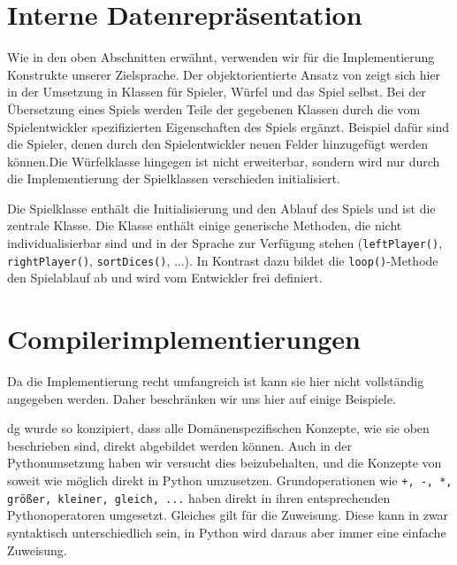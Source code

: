\section{Interne Datenrepräsentation} %
\label{sec:interne_datenreprasentation}
    Wie in den oben Abschnitten erwähnt, verwenden wir für die Implementierung Konstrukte unserer Zielsprache. Der objektorientierte Ansatz von \dg zeigt sich hier in der Umsetzung in Klassen für Spieler, Würfel und das Spiel selbst. Bei der Übersetzung eines Spiels werden Teile der gegebenen Klassen durch die vom Spielentwickler spezifizierten Eigenschaften des Spiels ergänzt. Beispiel dafür sind die Spieler, denen durch den Spielentwickler neuen Felder hinzugefügt werden können.Die Würfelklasse hingegen ist nicht erweiterbar, sondern wird nur durch die Implementierung der Spielklassen verschieden initialisiert.
    
    Die Spielklasse enthält die Initialisierung und den Ablauf des Spiels und ist die zentrale Klasse. Die Klasse enthält einige generische Methoden, die nicht individualisierbar sind und in der Sprache zur Verfügung stehen (\texttt{leftPlayer()}, \texttt{rightPlayer()}, \texttt{sortDices()}, ...). In Kontrast dazu bildet die \texttt{loop()}-Methode den Spielablauf ab und wird vom Entwickler frei definiert.
    

\section{Compilerimplementierungen}
\label{sec:compilerimplementierungen}
	Da die Implementierung recht umfangreich ist kann sie hier nicht vollständig angegeben werden. Daher beschränken wir uns hier auf einige Beispiele.
	
dg wurde so konzipiert, dass alle Domänenspezifischen Konzepte, wie sie oben beschrieben sind, direkt abgebildet werden können. Auch in der Pythonumsetzung haben wir versucht dies beizubehalten, und die Konzepte von \dg soweit wie möglich direkt in Python umzusetzen. Grundoperationen wie \texttt{+, -, *, größer, kleiner, gleich, ...} haben direkt in ihren entsprechenden Pythonoperatoren umgesetzt. Gleiches gilt für die Zuweisung. Diese kann in \dg zwar syntaktisch unterschiedlich sein, in Python wird daraus aber immer eine einfache Zuweisung.
	
